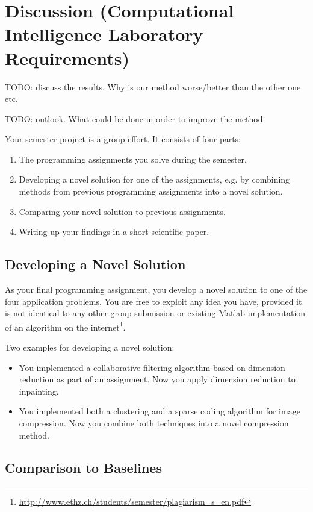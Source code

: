 
\section{Discussion (Computational Intelligence Laboratory Requirements)}
\label{sec:discussion}
\label{sec:cil}

TODO: discuss the results. Why is our method worse/better than the other one etc.

TODO: outlook. What could be done in order to improve the method.


Your semester project is a group effort. It consists of four parts:
\begin{enumerate}
\item The programming assignments you solve during the semester.
\item Developing a novel solution for one of the assignments, e.g. by
  combining methods from previous programming assignments into a novel
  solution.
\item Comparing your novel solution to previous assignments.
\item Writing up your findings in a short scientific paper.
\end{enumerate}

\subsection{Developing a Novel Solution}

As your final programming assignment, you develop a novel solution to
one of the four application problems. You are free to exploit any idea
you have, provided it is not identical to any other group submission
or existing Matlab implementation of an algorithm on the
internet\footnote{\url{http://www.ethz.ch/students/semester/plagiarism_s_en.pdf}}.

Two examples for developing a novel solution:
\begin{itemize}
\item You implemented a collaborative filtering algorithm based on
  dimension reduction as part of an assignment. Now you apply
  dimension reduction to inpainting.
\item You implemented both a clustering and a sparse coding algorithm
  for image compression. Now you combine both techniques into a novel
  compression method.
\end{itemize}

\subsection{Comparison to Baselines}

